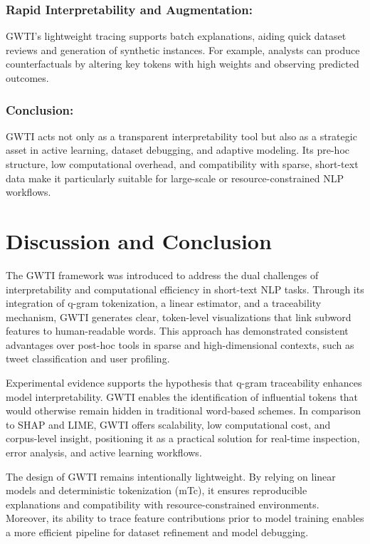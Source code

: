 \documentclass[runningheads,10pt]{llncs}
\begin{document}
\subsubsection*{Rapid Interpretability and Augmentation:} \ac{GWTI}'s lightweight tracing supports batch explanations, aiding quick dataset reviews and generation of synthetic instances. For example, analysts can produce counterfactuals by altering key tokens with high weights and observing predicted outcomes.

\subsubsection*{Conclusion:} \ac{GWTI} acts not only as a transparent interpretability tool but also as a strategic asset in active learning, dataset debugging, and adaptive modeling. Its pre-hoc structure, low computational overhead, and compatibility with sparse, short-text data make it particularly suitable for large-scale or resource-constrained NLP workflows.

\section{Discussion and Conclusion}
\label{sec/discussion}

The \ac{GWTI} framework was introduced to address the dual challenges of interpretability and computational efficiency in short-text NLP tasks. Through its integration of q-gram tokenization, a linear estimator, and a traceability mechanism, \ac{GWTI} generates clear, token-level visualizations that link subword features to human-readable words. This approach has demonstrated consistent advantages over post-hoc tools in sparse and high-dimensional contexts, such as tweet classification and user profiling.

Experimental evidence supports the hypothesis that q-gram traceability enhances model interpretability. \ac{GWTI} enables the identification of influential tokens that would otherwise remain hidden in traditional word-based schemes. In comparison to \ac{SHAP} and \ac{LIME}, \ac{GWTI} offers scalability, low computational cost, and corpus-level insight, positioning it as a practical solution for real-time inspection, error analysis, and active learning workflows.

The design of \ac{GWTI} remains intentionally lightweight. By relying on linear models and deterministic tokenization (\ac{mTc}), it ensures reproducible explanations and compatibility with resource-constrained environments. Moreover, its ability to trace feature contributions prior to model training enables a more efficient pipeline for dataset refinement and model debugging.
\end{document}
